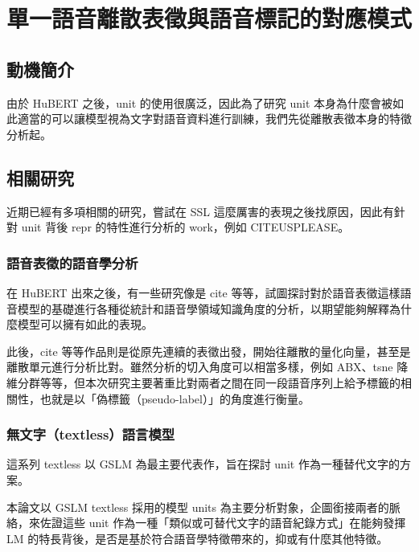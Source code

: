
\chapter{單一語音離散表徵與語音標記的對應模式}  %

\section{動機簡介}  %

由於 HuBERT 之後，unit 的使用很廣泛，因此為了研究 unit 本身為什麼會被如此適當的可以讓模型視為文字對語音資料進行訓練，我們先從離散表徵本身的特徵分析起。 

\section{相關研究}
近期已經有多項相關的研究，嘗試在 SSL 這麼厲害的表現之後找原因，因此有針對 unit 背後 repr 的特性進行分析的 work，例如 CITEUSPLEASE。 

\subsection{語音表徵的語音學分析}
在 HuBERT 出來之後，有一些研究像是 cite 等等，試圖探討對於語音表徵這樣語音模型的基礎進行各種從統計和語音學領域知識角度的分析，以期望能夠解釋為什麼模型可以擁有如此的表現。

此後，cite 等等作品則是從原先連續的表徵出發，開始往離散的量化向量，甚至是離散單元進行分析比對。雖然分析的切入角度可以相當多樣，例如 ABX、tsne 降維分群等等，但本次研究主要著重比對兩者之間在同一段語音序列上給予標籤的相關性，也就是以「偽標籤（pseudo-label）」的角度進行衡量。

\subsection{無文字（textless）語言模型}

這系列 textless 以 GSLM 為最主要代表作，旨在探討 unit 作為一種替代文字的方案。

本論文以 GSLM textless 採用的模型 units 為主要分析對象，企圖銜接兩者的脈絡，來佐證這些 unit 作為一種「類似或可替代文字的語音紀錄方式」在能夠發揮 LM 的特長背後，是否是基於符合語音學特徵帶來的，抑或有什麼其他特徵。

